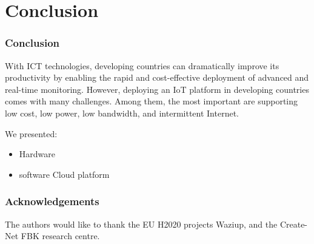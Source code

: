 \documentclass{beamer}
\begin{document}
\section{Conclusion}

\begin{frame}
\frametitle{Conclusion}
  
With ICT technologies, developing countries can dramatically improve its productivity by enabling the rapid and cost-effective deployment of advanced and real-time monitoring.
However, deploying an IoT platform in developing countries comes with many challenges.
Among them, the most important are supporting low cost, low power, low bandwidth, and intermittent Internet.

We presented:
  \begin{itemize}
    \item Hardware
    \item software Cloud platform 
  \end{itemize}

\end{frame}


\begin{frame}
\frametitle{Acknowledgements}

The authors would like to thank the EU H2020 projects Waziup, and the Create-Net FBK research centre. \\

\end{frame}
\end{document}
